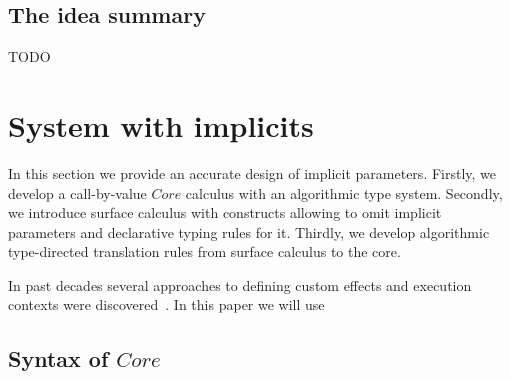 \documentclass[acmsmall]{acmart}
\begin{document}




\subsection{The idea summary} \label{subsec:idea-summary}

TODO %


\section{System with implicits} \label{sec:implicits}

In this section we provide an accurate design of implicit parameters.
Firstly, we develop a call-by-value $Core$ calculus with an algorithmic type system.
Secondly, we introduce surface calculus with constructs allowing to omit implicit parameters and declarative typing rules for it.
Thirdly, we develop algorithmic type-directed translation rules from surface calculus to the core.

In past decades several approaches to defining custom effects and execution contexts were discovered~\cite{plotkin2003algebraic, plotkin2013handling, moggi1988computational, liang1995monad, schrijvers2019monad}.
In this paper we will use

\subsection{Syntax of $Core$} \label{subsec:core-syntax}
\end{document}
